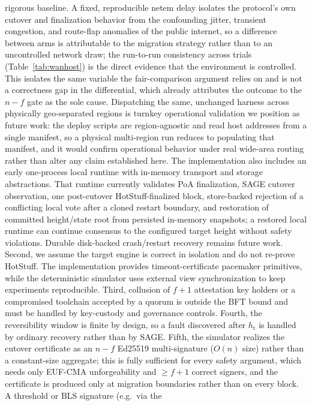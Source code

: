 \documentclass[journal]{IEEEtran}
\theoremstyle{definition}
\theoremstyle{remark}
\begin{document}
rigorous baseline. A fixed, reproducible netem delay isolates the protocol's own cutover and
finalization behavior from the confounding jitter, transient congestion, and route-flap anomalies
of the public internet, so a difference between arms is attributable to the migration strategy
rather than to an uncontrolled network draw; the run-to-run consistency across trials
(Table~\ref{tab:wanhost}) is the direct evidence that the environment is controlled. This isolates
the same variable the fair-comparison argument relies on and is not a correctness gap in the
differential, which already attributes the outcome to the $n{-}f$ gate as the sole cause.
Dispatching the same, unchanged harness across physically geo-separated regions is turnkey
operational validation we position as future work: the deploy scripts are region-agnostic and
read host addresses from a single manifest, so a physical multi-region run reduces to populating
that manifest, and it would confirm operational behavior under real wide-area routing rather than
alter any claim established here.
The implementation also includes an early one-process local runtime with
in-memory transport and storage abstractions. That runtime currently validates PoA finalization,
SAGE cutover observation, one post-cutover HotStuff-finalized block, store-backed rejection
of a conflicting local vote after a cloned restart boundary, and restoration of committed
height/state root from persisted in-memory snapshots; a restored local runtime can continue
consensus to the configured target height without safety violations. Durable disk-backed
crash/restart recovery remains future work. Second, we assume the target engine is correct in
isolation and do not re-prove HotStuff. The implementation provides timeout-certificate pacemaker
primitives, while the deterministic simulator uses external view synchronization to keep
experiments reproducible. Third, collusion of $f+1$ attestation key holders or a compromised
toolchain accepted by a quorum is outside the BFT bound and must be handled by key-custody and
governance controls. Fourth, the reversibility window is finite by design, so a fault discovered
after $h_{\mathrm{r}}$ is handled by ordinary recovery rather than by SAGE. Fifth, the simulator
realizes the cutover certificate as an $n-f$ Ed25519 multi-signature ($O(n)$ size) rather than a
constant-size aggregate; this is fully sufficient for every safety argument, which needs only
EUF-CMA unforgeability and $\ge f{+}1$ correct signers, and the certificate is produced only at
migration boundaries rather than on every block. A threshold or BLS signature (e.g.\ via the
\end{document}
